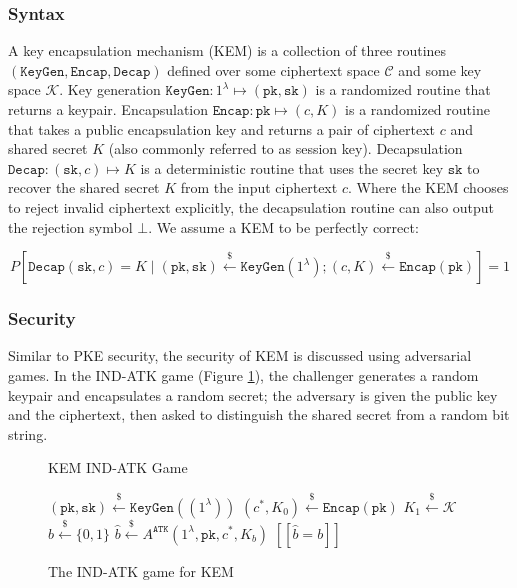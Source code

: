 \documentclass[runningheads]{llncs}
\newcommand{\keygen}{\texttt{KeyGen}}
\newcommand{\encap}{\texttt{Encap}}
\newcommand{\decap}{\texttt{Decap}}
\newcommand{\pk}{\texttt{pk}}
\newcommand{\sk}{\texttt{sk}}
\newcommand{\leftsample}{\stackrel{\$}{\leftarrow}}
\newcommand{\llbrack}{[\![}
\newcommand{\rrbrack}{]\!]}
\begin{document}
\subsubsection{Syntax} A key encapsulation mechanism (KEM) is a collection of three routines $(\keygen, \encap, \decap)$ defined over some ciphertext space $\mathcal{C}$ and some key space $\mathcal{K}$. Key generation $\keygen: 1^\lambda \mapsto (\pk, \sk)$ is a randomized routine that returns a keypair. Encapsulation $\encap: \pk \mapsto (c, K)$ is a randomized routine that takes a public encapsulation key and returns a pair of ciphertext $c$ and shared secret $K$ (also commonly referred to as session key). Decapsulation $\decap: (\sk, c) \mapsto K$ is a deterministic routine that uses the secret key $\sk$ to recover the shared secret $K$ from the input ciphertext $c$. Where the KEM chooses to reject invalid ciphertext explicitly, the decapsulation routine can also output the rejection symbol $\bot$. We assume a KEM to be perfectly correct:

$$
P\left[
    \decap(\sk, c) = K \mid (\pk, \sk) \leftsample \keygen(1^\lambda); (c, K) \leftsample \encap(\pk)
\right] = 1
$$

\subsubsection{Security} Similar to PKE security, the security of KEM is discussed using adversarial games. In the IND-ATK game (Figure \ref{fig:kem-ind-atk-game}), the challenger generates a random keypair and encapsulates a random secret; the adversary is given the public key and the ciphertext, then asked to distinguish the shared secret from a random bit string.

\begin{figure}[h]
    \centering
    \begin{minipage}[t]{0.5\textwidth}
        \begin{algorithm}[H]
            \caption*{KEM IND-ATK Game}
            \begin{algorithmic}[1]
                \State $(\pk, \sk) \leftsample \keygen((1^\lambda))$
                \State $(c^\ast, K_0) \leftsample \encap(\pk)$
                \State $K_1 \leftsample \mathcal{K}$
                \State $b \leftsample \{0,1\}$
                \State $\hat{b} \leftsample A^\texttt{ATK}(1^\lambda, \pk, c^\ast, K_b)$
                \State \Return $\llbrack \hat{b} = b \rrbrack$
            \end{algorithmic}
        \end{algorithm}
    \end{minipage}
    \caption{The IND-ATK game for KEM}\label{fig:kem-ind-atk-game}
\end{figure}
\end{document}
